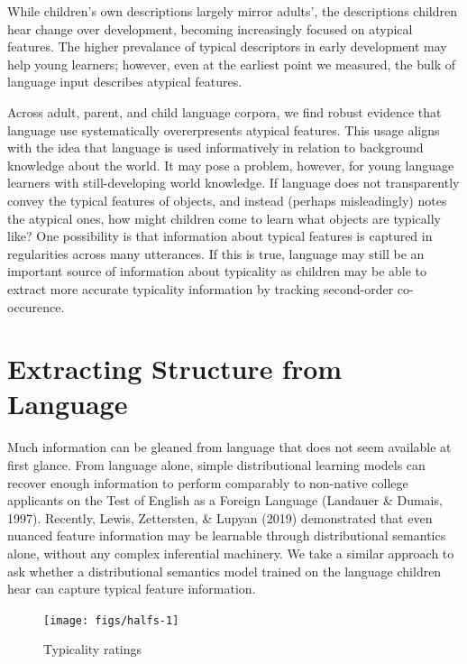 \documentclass[10pt, letterpaper]{article}
\newenvironment{CodeChunk}{}{}
\begin{document}
While children's own descriptions largely mirror adults', the
descriptions children hear change over development, becoming
increasingly focused on atypical features. The higher prevalance of
typical descriptors in early development may help young learners;
however, even at the earliest point we measured, the bulk of language
input describes atypical features.

Across adult, parent, and child language corpora, we find robust
evidence that language use systematically overerpresents atypical
features. This usage aligns with the idea that language is used
informatively in relation to background knowledge about the world. It
may pose a problem, however, for young language learners with
still-developing world knowledge. If language does not transparently
convey the typical features of objects, and instead (perhaps
misleadingly) notes the atypical ones, how might children come to learn
what objects are typically like? One possibility is that information
about typical features is captured in regularities across many
utterances. If this is true, language may still be an important source
of information about typicality as children may be able to extract more
accurate typicality information by tracking second-order co-occurence.

\hypertarget{extracting-structure-from-language}{%
\section{Extracting Structure from
Language}\label{extracting-structure-from-language}}

Much information can be gleaned from language that does not seem
available at first glance. From language alone, simple distributional
learning models can recover enough information to perform comparably to
non-native college applicants on the Test of English as a Foreign
Language (Landauer \& Dumais, 1997). Recently, Lewis, Zettersten, \&
Lupyan (2019) demonstrated that even nuanced feature information may be
learnable through distributional semantics alone, without any complex
inferential machinery. We take a similar approach to ask whether a
distributional semantics model trained on the language children hear can
capture typical feature information.

\begin{CodeChunk}
\begin{figure}[tb]

{\centering \texttt{[image: figs/halfs-1]} 

}

\caption[Typicality ratings]{Typicality ratings}\label{fig:halfs}
\end{figure}
\end{CodeChunk}
\end{document}
